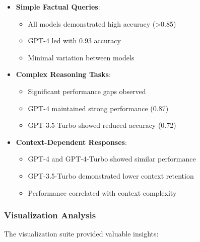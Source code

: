 \begin{itemize}
    \item \textbf{Simple Factual Queries}:
    \begin{itemize}
        \item All models demonstrated high accuracy (>0.85)
        \item GPT-4 led with 0.93 accuracy
        \item Minimal variation between models
    \end{itemize}

    \item \textbf{Complex Reasoning Tasks}:
    \begin{itemize}
        \item Significant performance gaps observed
        \item GPT-4 maintained strong performance (0.87)
        \item GPT-3.5-Turbo showed reduced accuracy (0.72)
    \end{itemize}

    \item \textbf{Context-Dependent Responses}:
    \begin{itemize}
        \item GPT-4 and GPT-4-Turbo showed similar performance
        \item GPT-3.5-Turbo demonstrated lower context retention
        \item Performance correlated with context complexity
    \end{itemize}
\end{itemize}

\subsubsection{Visualization Analysis}
The visualization suite provided valuable insights:

